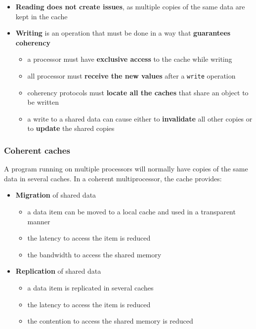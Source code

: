 \documentclass[english]{article}
\begin{document}
\begin{itemize}
  \item \textbf{Reading does not create issues}, as multiple copies of the same data are kept in the cache
  \item \textbf{Writing} is an operation that must be done in a way that \textbf{guarantees coherency}
        \begin{itemize}
          \item a processor must have \textbf{exclusive access} to the cache while writing
          \item all processor must \textbf{receive the new values} after a \texttt{write} operation
          \item coherency protocols must \textbf{locate all the caches} that share an object to be written
          \item a write to a shared data can cause either to \textbf{invalidate} all other copies or to \textbf{update} the shared copies
        \end{itemize}
\end{itemize}

\subsubsection{Coherent caches}

A program running on multiple processors will normally have copies of the same data in several caches.
In a coherent multiprocessor, the cache provides:

\begin{itemize}
  \item \textbf{Migration} of shared data
        \begin{itemize}
          \item a data item can be moved to a local cache and used in a transparent manner
          \item the latency to access the item is reduced
          \item the bandwidth to access the shared memory
        \end{itemize}
  \item \textbf{Replication} of shared data
        \begin{itemize}
          \item a data item is replicated in several caches
          \item the latency to access the item is reduced
          \item the contention to access the shared memory is reduced
        \end{itemize}
\end{itemize}
\end{document}
